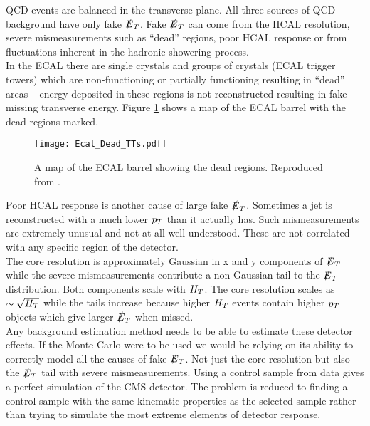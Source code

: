 QCD events are balanced in the transverse plane. All three sources of QCD 
background have only fake $\slashed{E}_{T}$. Fake $\slashed{E}_{T}$ can come from the HCAL resolution, 
severe mismeasurements such as ``dead'' regions, poor HCAL response or from 
fluctuations inherent in the hadronic showering process. \\

In the ECAL there are single crystals and groups of crystals (ECAL trigger
towers) which are non-functioning or partially functioning resulting in ``dead''
areas -- energy deposited in these regions is not reconstructed resulting in
fake missing transverse energy. Figure \ref{fig:Dead_ECAL_TTs} shows a map of 
the ECAL barrel with the dead regions marked. \\

\begin{figure}
\begin{center}
\texttt{[image: Ecal\_Dead\_TTs.pdf]}
\end{center}
\caption{A map of the ECAL barrel showing the dead regions. Reproduced from 
\cite{spikes}.}
\label{fig:Dead_ECAL_TTs}
\end{figure}

Poor HCAL response is another cause of large fake $\slashed{E}_{T}$. Sometimes a jet is
reconstructed with a much lower $p_{T}$ than it actually has. Such mismeasurements
are extremely unusual and not at all well understood. These are not
correlated with any specific region of the detector. \\

The core resolution is approximately Gaussian in x and y components of $\slashed{E}_{T}$ 
while the severe mismeasurements contribute a non-Gaussian tail to the $\slashed{E}_{T}$ 
distribution. Both components scale with $H_{T}$. The core resolution scales as
$\sim\sqrt{H_{T}}$ while the tails increase because higher $H_{T}$ events contain 
higher $p_{T}$ objects which give larger $\slashed{E}_{T}$ when missed. \\

Any background estimation method needs to be able to estimate these detector 
effects. If the Monte Carlo were to be used we would be relying on its ability 
to correctly model all the causes of fake $\slashed{E}_{T}$. Not just the core resolution 
but also the $\slashed{E}_{T}$ tail with severe mismeasurements. Using a control sample 
from data gives a perfect simulation of the CMS detector. The problem is reduced
to finding a control sample with the same kinematic properties as the selected 
sample rather than trying to simulate the most extreme elements of detector
response. \\

